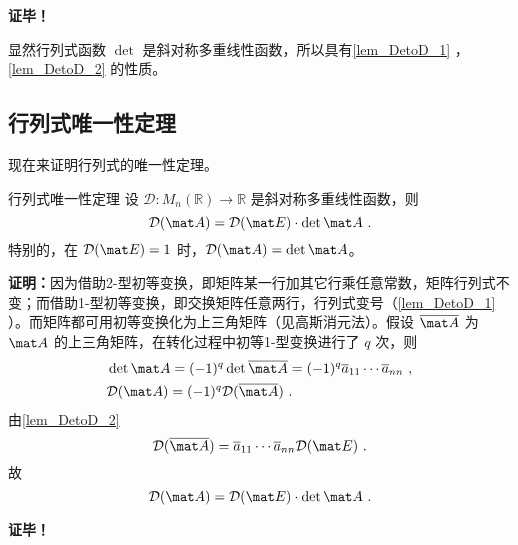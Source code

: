 \textbf{证毕！}

显然行列式函数 $\det$ 是斜对称多重线性函数，所以具有\autoref{lem_DetoD_1} ，\autoref{lem_DetoD_2} 的性质。
\subsection{行列式唯一性定理}
现在来证明行列式的唯一性定理。
\begin{theorem}{行列式唯一性定理}
设 $\mathcal D:M_n(\mathbb R)\rightarrow \mathbb R$ 是斜对称多重线性函数，则
\begin{equation}
\mathcal D(\mat A)=\mathcal D(\mat E)\cdot \det \mat A~.
\end{equation}
特别的，在 $\mathcal D(\mat E)=1$ 时，$\mathcal D(\mat A)=\det \mat A$。
\end{theorem}
\textbf{证明：}因为借助2-型初等变换，即矩阵某一行加其它行乘任意常数，矩阵行列式不变；而借助1-型初等变换，即交换矩阵任意两行，行列式变号（\autoref{lem_DetoD_1} ）。而矩阵都可用初等变换化为上三角矩阵（见高斯消元法）。假设 $\overline{\mat A}$ 为 $\mat A$ 的上三角矩阵，在转化过程中初等1-型变换进行了 $q$ 次，则
\begin{equation}
\begin{aligned}
&\det{\mat A}=(-1)^q\det{\overline{\mat A}}=(-1)^q\overline{a}_{11}\cdots \overline{a}_{nn}~,\\
&\mathcal D(\mat A)=(-1)^q\mathcal{D}(\overline{\mat A})~.
\end{aligned}
\end{equation}
由\autoref{lem_DetoD_2}
\begin{equation}
\mathcal D(\overline{\mat A})=\overline{a}_{11}\cdots \overline{a}_{nn}\mathcal D(\mat E)~.
\end{equation}
故
\begin{equation}
\mathcal D(\mat A)=\mathcal D(\mat E)\cdot \det \mat A~.
\end{equation}

\textbf{证毕！}
